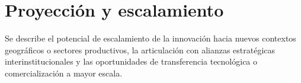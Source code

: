 \section{Proyección y escalamiento}
\label{sec:proyeccion_escalamiento}

Se describe el potencial de escalamiento de la innovación hacia nuevos contextos geográficos o sectores productivos, la articulación con alianzas estratégicas interinstitucionales y las oportunidades de transferencia tecnológica o comercialización a mayor escala.
